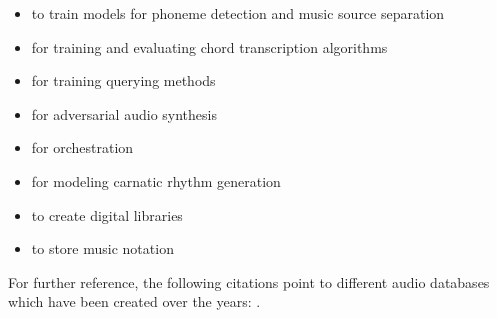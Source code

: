\begin{itemize}
\item to train models for phoneme detection \parencite{DBLP:conf/ismir/ProutskovaRWC12} and music source separation \parencite{marius_miron_2017_1401923}
\item for training and evaluating chord transcription algorithms \parencite{DBLP:conf/ismir/EremenkoDBS18}
\item for training querying methods \parencites{mark_cartwright_2012_850060}{DBLP:journals/corr/Brzezinski-SpiczakDLP13}{DBLP:journals/corr/NagaviB14}{DBLP:journals/corr/abs-1301-1894}{icmc/bbp2372.1999.355} 


\item for adversarial audio synthesis \parencite{2018arXiv180204208D}
\item for orchestration \parencite{DBLP:conf/ismir/CrestelEHM17}
\item for modeling carnatic rhythm generation \parencite{carlos_guedes_2018_1422615}

\item to create digital libraries \parencite{DBLP:conf/ismir/Dunn00}
\item to store music notation \parencite{DBLP:conf/ismir/Good00}
\end{itemize}

For further reference, the following citations point to different audio databases which have been created over the years: \textcites{DBLP:conf/ismir/GotoHNO02}{DBLP:conf/ismir/GotoHNO03}{DBLP:conf/ismir/WustC04}{DBLP:conf/ismir/MaxwellE08}{DBLP:conf/ismir/Bertin-MahieuxEWL11}{DBLP:conf/ismir/Karaosmanoglu12}{Jaimovich:2012}{Mital:2013}{bbortz:2015}{jjaimovich:2015,Nort2016}{ DBLP:conf/ismir/DefferrardBVB17}{DBLP:conf/ismir/VigliensoniF17}{DBLP:conf/ismir/Meseguer-Brocal18}{DBLP:conf/ismir/DonahueMM18}{DBLP:conf/ismir/XiBPYB18}{DBLP:conf/ismir/WilkinsSWP18}.